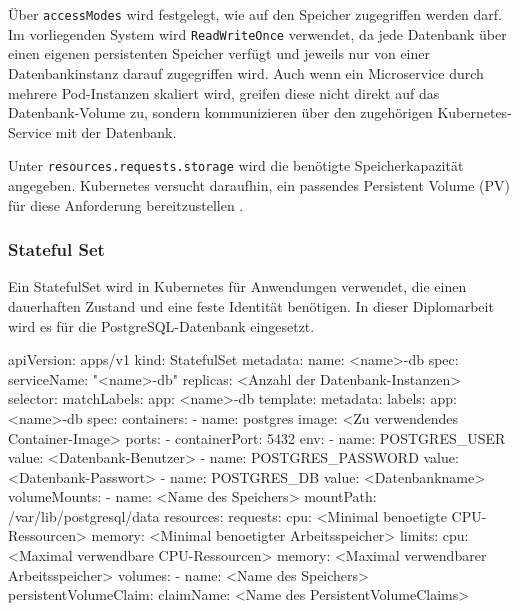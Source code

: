 Über \texttt{accessModes} wird festgelegt, wie auf den Speicher zugegriffen werden darf. Im vorliegenden System wird \texttt{ReadWriteOnce} verwendet, da jede Datenbank über einen eigenen persistenten Speicher verfügt und jeweils nur von einer Datenbankinstanz darauf zugegriffen wird. Auch wenn ein Microservice durch mehrere Pod-Instanzen skaliert wird, greifen diese nicht direkt auf das Datenbank-Volume zu, sondern kommunizieren über den zugehörigen Kubernetes-Service mit der Datenbank.

Unter \texttt{resources.requests.storage} wird die benötigte Speicherkapazität angegeben. Kubernetes versucht daraufhin, ein passendes Persistent Volume (PV) für diese Anforderung bereitzustellen \cite{kubernetes_pvc}.

\newpage

\subsubsection{Stateful Set}

Ein StatefulSet wird in Kubernetes für Anwendungen verwendet, die einen dauerhaften Zustand und eine feste Identität benötigen. In dieser Diplomarbeit wird es für die PostgreSQL-Datenbank eingesetzt.

\begin{CodeBox}
apiVersion: apps/v1
kind: StatefulSet
metadata:
  name: <name>-db
spec:
  serviceName: "<name>-db"
  replicas: <Anzahl der Datenbank-Instanzen>
  selector:
    matchLabels:
      app: <name>-db
  template:
    metadata:
      labels:
        app: <name>-db
    spec:
      containers:
        - name: postgres
          image: <Zu verwendendes Container-Image>
          ports:
            - containerPort: 5432
          env:
            - name: POSTGRES_USER
              value: <Datenbank-Benutzer>
            - name: POSTGRES_PASSWORD
              value: <Datenbank-Passwort>
            - name: POSTGRES_DB
              value: <Datenbankname>
          volumeMounts:
            - name: <Name des Speichers>
              mountPath: /var/lib/postgresql/data
          resources:
            requests:
              cpu: <Minimal benoetigte CPU-Ressourcen>
              memory: <Minimal benoetigter Arbeitsspeicher>
            limits:
              cpu: <Maximal verwendbare CPU-Ressourcen>
              memory: <Maximal verwendbarer Arbeitsspeicher>
      volumes:
        - name: <Name des Speichers>
          persistentVolumeClaim:
            claimName: <Name des PersistentVolumeClaims>
\end{CodeBox}

